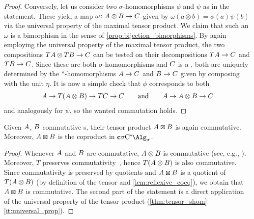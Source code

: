 \begin{proof}
	Conversely, let us consider two $\sigma$-homomorphisms $\phi$ and $\psi$ as in the statement.
	These yield a map $\omega \colon {A} \otimes {B} \to {C}$ given by $\omega (a\otimes b)=\phi(a)\psi(b)$ via the universal property of the maximal tensor product. We claim that such an $\omega$ is a bimorphism in the sense of \cref{prop:bijection_bimorphisms}.
	By again employing the universal property of the maximal tensor product, the two compositions $T{A} \otimes T{B}\to {C}$ can be tested on their decompositions $T{A} \to {C}$ and $T{B} \to {C}$.
	Since these are both $\sigma$-homomorphisms and ${C}$ is a \cstars{}, both are uniquely determined by the $*$-homomorphisms ${A} \to {C}$ and ${B} \to {C}$ given by composing with the unit $\eta$.
	It is now a simple check that $\phi$ corresponds to both
	\[
		{A} \to T({A}\otimes {B}) \to T{C} \to {C} \qquad \text{and}\qquad {A} \to {A}\otimes {B}\to {C}
	\]
	and analogously for $\psi$, so the wanted commutation holds.
\end{proof}


\begin{proposition}\label{prop:tensor_commutative}
	Given ${A}$, ${B}$ commutative \cstars{}s, their tensor product $\A \kocktensor \B$ is again commutative.
	Moreover, $\A\kocktensor \B$ is the coproduct in $\cSigmaC$.
\end{proposition}

\begin{proof}
	Whenever ${A}$ and ${B}$ are commutative, ${A} \otimes{B}$ is commutative  (see, e.g., \cite[Lemma T.6.16]{weggeolsen1993Ktheory}).
	Moreover, $T$ preserves commutativity~\cite[Remark 5.3.4(iii)]{saito15monotone}, hence $T({A}\otimes {B})$ is also commutative.
	Since commutativity is preserved by quotients and $\A \kocktensor \B$ is a quotient of $T({A}\otimes {B})$ (by definition of the tensor and \cref{lem:reflexive_coeq}), we obtain that $\A\kocktensor \B$ is commutative.
	The second part of the statement is a direct application of the universal property of the tensor product (\cref{thm:tensor_shom}\ref{it:universal_prop}).
\end{proof}

